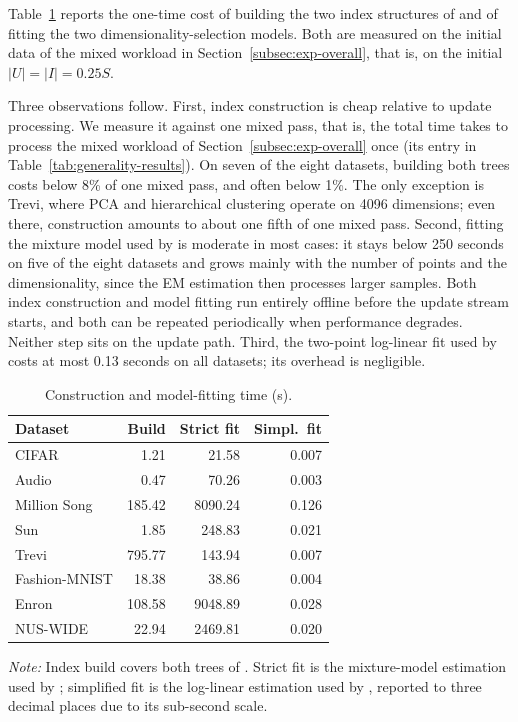 Table~\ref{tab:index-build} reports the one-time cost of building the two index structures of \dualtree and of fitting the two dimensionality-selection models. Both are measured on the initial data of the mixed workload in Section~\ref{subsec:exp-overall}, that is, on the initial $|U|=|I|=0.25S$.

Three observations follow. First, index construction is cheap relative to update processing. We measure it against one mixed pass, that is, the total time \dualtreeopt takes to process the mixed workload of Section~\ref{subsec:exp-overall} once (its entry in Table~\ref{tab:generality-results}). On seven of the eight datasets, building both trees costs below 8\% of one mixed pass, and often below 1\%. The only exception is Trevi, where PCA and hierarchical clustering operate on 4096 dimensions; even there, construction amounts to about one fifth of one mixed pass. Second, fitting the mixture model used by \dualtreeopt is moderate in most cases: it stays below 250 seconds on five of the eight datasets and grows mainly with the number of points and the dimensionality, since the EM estimation then processes larger samples. Both index construction and model fitting run entirely offline before the update stream starts, and both can be repeated periodically when performance degrades. Neither step sits on the update path. Third, the two-point log-linear fit used by \dualtreefast costs at most 0.13 seconds on all datasets; its overhead is negligible.

\begin{table}[t]
\centering
\caption{Construction and model-fitting time (s).}
\label{tab:index-build}
\footnotesize
\begin{tabular*}{\columnwidth}{@{\extracolsep{\fill}}lrrr@{}}
\toprule
\textbf{Dataset} & \textbf{Build} & \textbf{Strict fit} & \textbf{Simpl.\ fit} \\
\midrule
CIFAR         & 1.21   & 21.58   & 0.007 \\
Audio         & 0.47   & 70.26   & 0.003 \\
Million Song  & 185.42 & 8090.24 & 0.126 \\
Sun           & 1.85   & 248.83  & 0.021 \\
Trevi         & 795.77 & 143.94  & 0.007 \\
Fashion-MNIST & 18.38  & 38.86   & 0.004 \\
Enron         & 108.58 & 9048.89 & 0.028 \\
NUS-WIDE      & 22.94  & 2469.81 & 0.020 \\
\bottomrule
\end{tabular*}
\vspace{0.2em}
\begin{minipage}{\columnwidth}
\footnotesize
\emph{Note:} Index build covers both trees of \dualtree. Strict fit is the mixture-model estimation used by \dualtreeopt; simplified fit is the log-linear estimation used by \dualtreefast, reported to three decimal places due to its sub-second scale.
\end{minipage}
\end{table}

